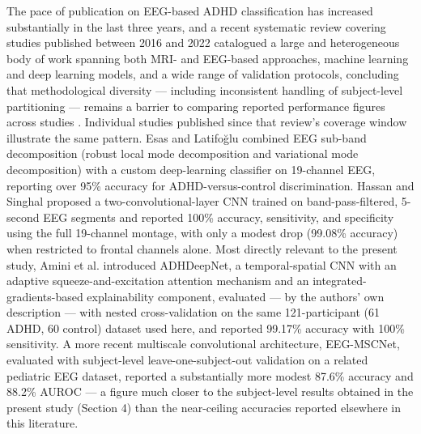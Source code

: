 \documentclass[a4paper,fleqn]{cas-sc}
\begin{document}
The pace of publication on EEG-based ADHD classification has increased substantially in the last three years, and a recent systematic review covering studies published between 2016 and 2022 catalogued a large and heterogeneous body of work spanning both MRI- and EEG-based approaches, machine learning and deep learning models, and a wide range of validation protocols, concluding that methodological diversity --- including inconsistent handling of subject-level partitioning --- remains a barrier to comparing reported performance figures across studies \cite{lohani2025systematic}. Individual studies published since that review's coverage window illustrate the same pattern. Esas and Latifoğlu \cite{esas2023detection} combined EEG sub-band decomposition (robust local mode decomposition and variational mode decomposition) with a custom deep-learning classifier on 19-channel EEG, reporting over 95\% accuracy for ADHD-versus-control discrimination. Hassan and Singhal \cite{hassan2024convolutional} proposed a two-convolutional-layer CNN trained on band-pass-filtered, 5-second EEG segments and reported 100\% accuracy, sensitivity, and specificity using the full 19-channel montage, with only a modest drop (99.08\% accuracy) when restricted to frontal channels alone. Most directly relevant to the present study, Amini et al. \cite{amini2025adhdeepnet} introduced ADHDeepNet, a temporal-spatial CNN with an adaptive squeeze-and-excitation attention mechanism and an integrated-gradients-based explainability component, evaluated --- by the authors' own description --- with nested cross-validation on the same 121-participant (61 ADHD, 60 control) dataset used here, and reported 99.17\% accuracy with 100\% sensitivity. A more recent multiscale convolutional architecture, EEG-MSCNet, evaluated with subject-level leave-one-subject-out validation on a related pediatric EEG dataset, reported a substantially more modest 87.6\% accuracy and 88.2\% AUROC \cite{sanchis2026multiscale} --- a figure much closer to the subject-level results obtained in the present study (Section 4) than the near-ceiling accuracies reported elsewhere in this literature.
\end{document}

